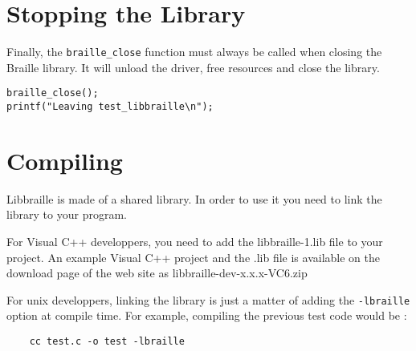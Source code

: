 \documentclass[12pt,a4paper]{article}
\begin{document}
\section{Stopping the Library}

Finally, the {\tt braille\_close} function must always be called when
closing the Braille library. It will unload the driver, free resources
and close the library.

\begin{verbatim}
braille_close();
printf("Leaving test_libbraille\n");
\end{verbatim}

\section{Compiling}

Libbraille is made of a shared library. In order to use it you need to
link the library to your program.

For Visual C++ developpers, you need to add the libbraille-1.lib file
to your project. An example Visual C++ project and the .lib file is
available on the download page of the web site as
libbraille-dev-x.x.x-VC6.zip

For unix developpers, linking the library is just a matter of
adding the {\tt-lbraille} option at compile time.
For example, compiling the previous test code would be :
\begin{verbatim}
    cc test.c -o test -lbraille
\end{verbatim}
\end{document}

